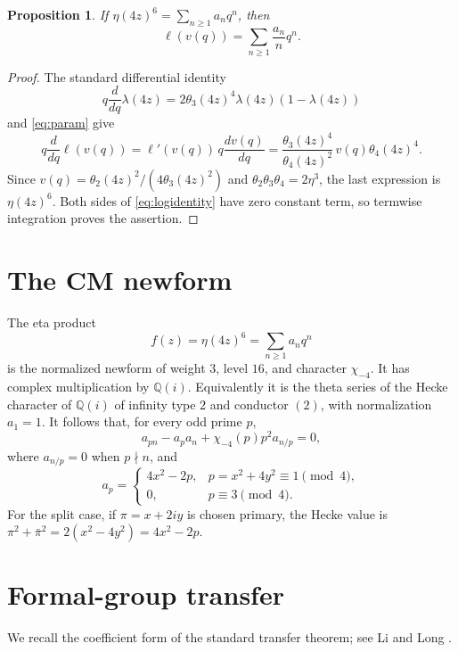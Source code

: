 \documentclass[11pt]{article}
\newtheorem{proposition}[theorem]{Proposition}
\theoremstyle{remark}
\newcommand{\Q}{\mathbb Q}
\newcommand{\chiD}{\chi_{-4}}
\begin{document}
\begin{proposition}\label{prop:log}
If $\eta(4z)^6=\sum_{n\ge1}a_nq^n$, then
\begin{equation}\label{eq:logidentity}
\ell(v(q))=\sum_{n\ge1}\frac{a_n}{n}q^n.
\end{equation}
\end{proposition}

\begin{proof}
The standard differential identity
\[
q\frac{d}{dq}\lambda(4z)
=2\theta_3(4z)^4\lambda(4z)(1-\lambda(4z))
\]
and \eqref{eq:param} give
\[
q\frac{d}{dq}\ell(v(q))
=\ell'(v(q))\,q\frac{dv(q)}{dq}
=\frac{\theta_3(4z)^4}{\theta_4(4z)^2}\,
v(q)\theta_4(4z)^4.
\]
Since $v(q)=\theta_2(4z)^2/(4\theta_3(4z)^2)$ and
$\theta_2\theta_3\theta_4=2\eta^3$, the last expression is
$\eta(4z)^6$.  Both sides of \eqref{eq:logidentity} have zero constant
term, so termwise integration proves the assertion.
\end{proof}

\section{The CM newform}

The eta product
\[
f(z)=\eta(4z)^6=\sum_{n\ge1}a_nq^n
\]
is the normalized newform of weight $3$, level $16$, and character
$\chiD$.  It has complex multiplication by $\Q(i)$.  Equivalently it is
the theta series of the Hecke character of $\Q(i)$ of infinity type $2$
and conductor $(2)$, with normalization $a_1=1$.  It follows that, for
every odd prime $p$,
\begin{equation}\label{eq:hecke}
a_{pn}-a_pa_n+\chiD(p)p^2a_{n/p}=0,
\end{equation}
where $a_{n/p}=0$ when $p\nmid n$, and
\begin{equation}\label{eq:ap}
a_p=\begin{cases}
4x^2-2p,&p=x^2+4y^2\equiv1\pmod4,\\
0,&p\equiv3\pmod4.
\end{cases}
\end{equation}
For the split case, if $\pi=x+2iy$ is chosen primary, the Hecke value is
$\pi^2+\bar\pi^2=2(x^2-4y^2)=4x^2-2p$.

\section{Formal-group transfer}

We recall the coefficient form of the standard transfer theorem; see
Li and Long \cite[Proposition 3 and Theorem 6]{LiLong}.
\end{document}
